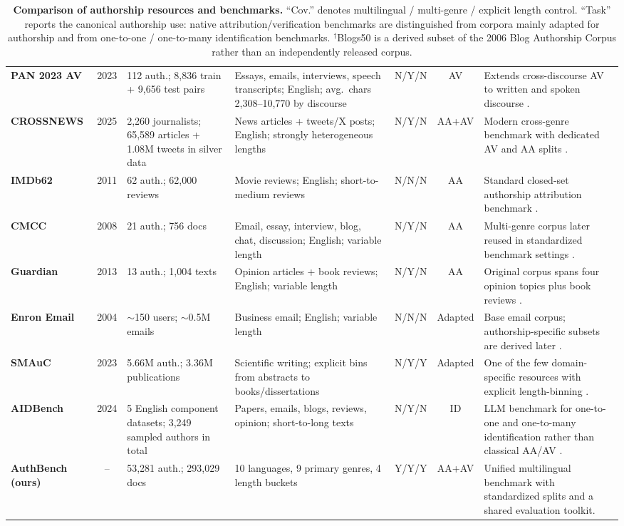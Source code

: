 \documentclass[11pt]{article}
\begin{document}
{\begin{table}[t]
\begin{tabular}{@{}L{2.45cm}cL{2.15cm}L{4.65cm}c c L{4.35cm}@{}}
\textbf{PAN 2023 AV} & 2023 & 112 auth.; 8{,}836 train + 9{,}656 test pairs & Essays, emails, interviews, speech transcripts; English; avg.\ chars 2{,}308--10{,}770 by discourse & N/Y/N & AV & Extends cross-discourse AV to written and spoken discourse \citep{pan2023av}. \\
\textbf{CROSSNEWS} & 2025 & 2{,}260 journalists; 65{,}589 articles + 1.08M tweets in silver data & News articles + tweets/X posts; English; strongly heterogeneous lengths & N/Y/N & AA+AV & Modern cross-genre benchmark with dedicated AV and AA splits \citep{ma2025crossnews}. \\
\textbf{IMDb62} & 2011 & 62 auth.; 62{,}000 reviews & Movie reviews; English; short-to-medium reviews & N/N/N & AA & Standard closed-set authorship attribution benchmark \citep{seroussi2014authorship}. \\
\textbf{CMCC} & 2008 & 21 auth.; 756 docs & Email, essay, interview, blog, chat, discussion; English; variable length & N/Y/N & AA & Multi-genre corpus later reused in standardized benchmark settings \citep{goldstein-stewart-etal-2008-creating}. \\
\textbf{Guardian} & 2013 & 13 auth.; 1{,}004 texts & Opinion articles + book reviews; English; variable length & N/Y/N & AA & Original corpus spans four opinion topics plus book reviews \citep{stamatatos2013robustness}. \\
\textbf{Enron Email} & 2004 & $\sim$150 users; $\sim$0.5M emails & Business email; English; variable length & N/N/N & Adapted & Base email corpus; authorship-specific subsets are derived later \citep{klimt2004enron}. \\
\textbf{SMAuC} & 2023 & 5.66M auth.; 3.36M publications & Scientific writing; explicit bins from abstracts to books/dissertations & N/Y/Y & Adapted & One of the few domain-specific resources with explicit length-binning \citep{bevendorff2023smauc}. \\
\textbf{AIDBench} & 2024 & 5 English component datasets; 3{,}249 sampled authors in total & Papers, emails, blogs, reviews, opinion; short-to-long texts & N/Y/N & ID & LLM benchmark for one-to-one and one-to-many identification rather than classical AA/AV \citep{wen2024aidbench}. \\
\midrule
\textbf{AuthBench (ours)} & -- & 53{,}281 auth.; 293{,}029 docs & 10 languages, 9 primary genres, 4 length buckets & Y/Y/Y & AA+AV & Unified multilingual benchmark with standardized splits and a shared evaluation toolkit. \\
\bottomrule
\end{tabular}
\caption{\textbf{Comparison of authorship resources and benchmarks.} ``Cov.'' denotes multilingual / multi-genre / explicit length control. ``Task'' reports the canonical authorship use: native attribution/verification benchmarks are distinguished from corpora mainly adapted for authorship and from one-to-one / one-to-many identification benchmarks. $^\dagger$Blogs50 is a derived subset of the 2006 Blog Authorship Corpus rather than an independently released corpus.}
\label{tab:bench-comparison}
\end{table}
}
\end{document}
